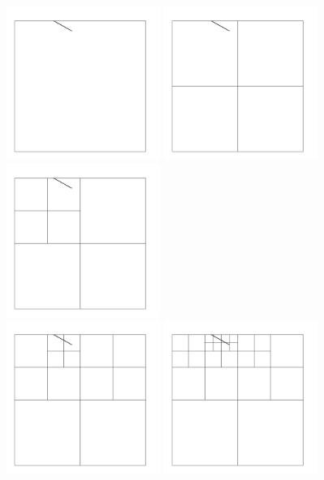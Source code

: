 \newpage

\includegraphics[width=5cm]{images/meshes/AMR/amr0}
\includegraphics[width=5cm]{images/meshes/AMR/amr1}
\includegraphics[width=5cm]{images/meshes/AMR/amr2}\\
\includegraphics[width=5cm]{images/meshes/AMR/amr3}
\includegraphics[width=5cm]{images/meshes/AMR/amr4}
